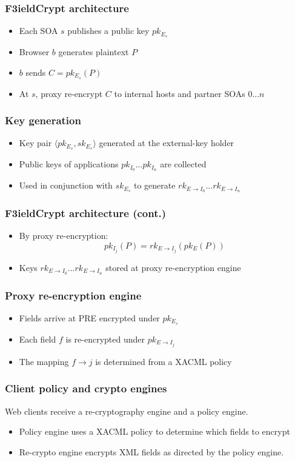 \documentclass{beamer}
\begin{document}
\begin{frame}
\frametitle{F3ieldCrypt architecture}
\begin{itemize}
\item Each SOA $s$ publishes a public key $pk_{E_s}$
\item Browser $b$ generates plaintext $P$
\item $b$ sends $C = pk_{E_s}(P)$ 
\item At $s$, proxy re-encrypt $C$ to internal hosts and partner SOAs $0...n$ 
\end{itemize}
\end{frame}

\begin{frame}
\frametitle{Key generation}
\begin{itemize}
\item Key pair $\langle pk_{E_s}, sk_{E_s} \rangle$ generated at the
\alert{external-key holder}
\item Public keys of applications $pk_{I_0}...pk_{I_n}$ are collected
\item Used in conjunction with $sk_{E_s}$ to generate $rk_{E \to I_0}...rk_{E
\to I_n}$
\end{itemize}
\end{frame}

\begin{frame}
\frametitle{F3ieldCrypt architecture (cont.)}
\begin{itemize}
\item By proxy re-encryption:
\begin{equation*}
pk_{I_j}(P) = rk_{E \to I_j}( pk_E (P))
\end{equation*}
\item Keys $rk_{E \to I_0}...rk_{E \to I_n}$ stored at \alert{proxy
re-encryption engine}
\end{itemize}
\end{frame}

\begin{frame}
\frametitle{Proxy re-encryption engine}
\begin{itemize}
\item Fields arrive at PRE encrypted under $pk_{E_s}$
\item Each field $f$ is re-encrypted under $pk_{E \to I_j}$
\item The mapping $f \to j$ is determined from a XACML policy
\end{itemize}
\end{frame}

\begin{frame}
\frametitle{Client policy and crypto engines}
Web clients receive a re-cryptography engine and a policy engine. 
\medskip
\begin{itemize}
\item \alert{Policy engine} uses a XACML policy to determine which fields to
encrypt
\item \alert{Re-crypto engine} encrypts XML fields as directed by the policy
engine.
\end{itemize}
\end{frame}
\end{document}
